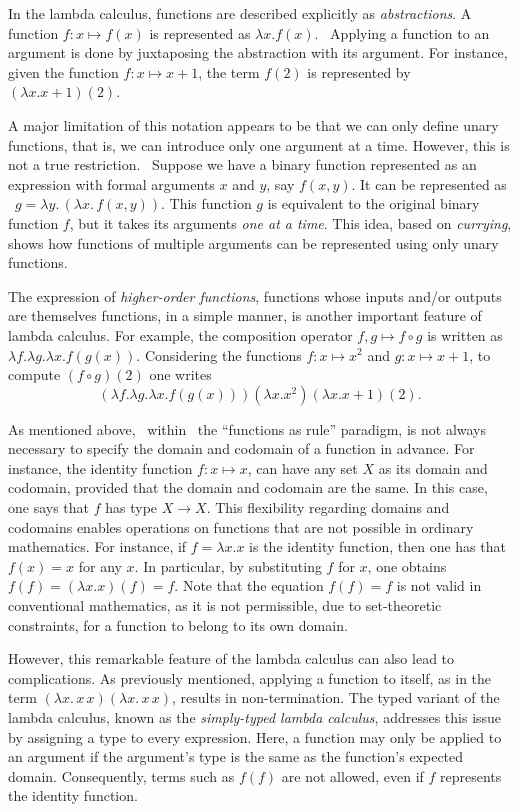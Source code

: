 In the lambda calculus, functions are described explicitly as \emph{abstractions}. A function $f:x \mapsto f(x)$ is represented as $\lambda x.f(x)$.  Applying a function to an argument is done by juxtaposing the abstraction with its argument. For instance, given the function $f:x \mapsto x+1$, the term $f(2)$ is represented by $(\lambda x.x+1)(2)$.

A major limitation of this notation appears to be that we can only define unary functions, that is, we can introduce only one argument at a time. However, this is not a true restriction.  Suppose we have a binary function represented as an expression with formal arguments $ x $ and $ y $, say $f(x, y)$. It can be represented as  $g = \lambda y.\, (\lambda x.\, f(x, y))$.
This function $ g $ is equivalent to the original binary function $ f $, but it takes its arguments \emph{one at a time}. This idea, based on \emph{currying}, shows how functions of multiple arguments can be represented using only unary functions.

The expression of \emph{higher‑order functions}, functions whose inputs and/or outputs are themselves functions, in a simple manner, is another important feature of lambda calculus. For example, the composition operator $f,g \mapsto f \circ g$ is written as $\lambda f. \lambda g. \lambda x. f(g(x))$. Considering the functions $f:x \mapsto x^2$ and $g:x \mapsto x+1$, to compute $(f \circ g)(2)$ one writes $$(\lambda f. \lambda g. \lambda x. f(g(x)))(\lambda x.x^2)(\lambda x.x+1)(2).$$

As mentioned above,  within  the ``functions as rule'' paradigm, is not
always necessary to specify the domain and codomain of a function in advance. For instance, the identity function $f: x \mapsto x$, can have any set $X$ as its domain and codomain, provided that the domain and codomain are the same. In this case, one says that $f$ has type $X \rightarrow{} X$. This flexibility regarding domains and codomains enables operations on functions that are not possible in ordinary mathematics. For instance, if $f = \lambda x.x$ is the identity function, then one has that $f(x) = x$ for any $x$. In particular, by substituting $f$ for $x$, one obtains $f(f) = (\lambda x.x)(f) = f$. Note that the equation $f(f) = f$ is not valid in conventional mathematics, as it is not permissible, due to set-theoretic constraints, for a function to belong to its own domain.

However, this remarkable feature of the lambda calculus can also lead to complications. 
As previously mentioned, applying a function to itself, as in the term $(\lambda x.\,x\,x)(\lambda x.\,x\,x)$, results in non-termination. 
The typed variant of the lambda calculus, known as the \emph{simply-typed lambda calculus}, addresses this issue by assigning a type to every expression. 
Here, a function may only be applied to an argument if the argument's type is the same as the function's expected domain. Consequently, terms such as $f(f)$ are not allowed, even if $f$ represents the identity function.



